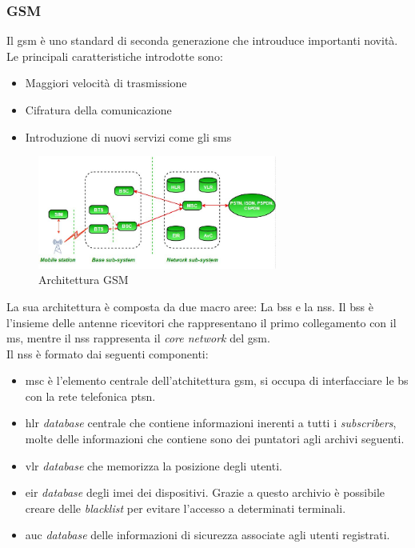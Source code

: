\subsubsection{GSM}
Il \gls{gsm}\cite{gsm} è uno standard di seconda generazione che introuduce importanti novità.\\
Le principali caratteristiche introdotte sono:
\begin{itemize}
    \item Maggiori velocità di trasmissione
    \item Cifratura della comunicazione
    \item Introduzione di nuovi servizi come gli \gls{sms}
\end{itemize}
\begin{figure}[ht]
    \centering
    \includegraphics[width=0.7\textwidth]{images/2g-gsm.jpg}
    \caption{Architettura GSM}
\end{figure}
La sua architettura è composta da due macro aree: La \gls{bss} e la \gls{nss}.
Il \gls{bss} è l'insieme delle antenne ricevitori che rappresentano il primo collegamento con il \gls{ms}, mentre il \gls{nss} rappresenta il \textit{core network} del \gls{gsm}.\\
Il \gls{nss} è formato dai seguenti componenti:
\begin{itemize}
    \item \gls{msc} è l'elemento centrale dell'atchitettura \gls{gsm}, si occupa di interfacciare le \gls{bs} con la rete telefonica \gls{ptsn}.
    \item \gls{hlr} \textit{database} centrale che contiene informazioni inerenti a tutti i \textit{subscribers}, molte delle informazioni
    che contiene sono dei puntatori agli archivi seguenti.
    \item \gls{vlr} \textit{database} che memorizza la posizione degli utenti.
    \item \gls{eir} \textit{database} degli \gls{imei} dei dispositivi. Grazie a questo archivio è possibile creare delle \textit{blacklist}
    per evitare l'accesso a determinati terminali.
    \item \gls{auc} \textit{database} delle informazioni di sicurezza associate agli utenti registrati.
\end{itemize}

